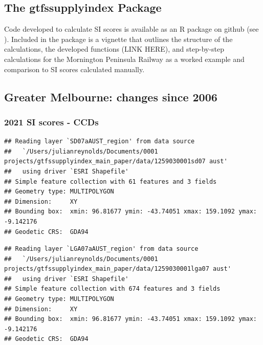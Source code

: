 \documentclass[preprint, 3p,
authoryear]{elsarticle} %
\begin{document}
\subsection{The gtfssupplyindex
Package}\label{the-gtfssupplyindex-package}

Code developed to calculate SI scores is available as an R package on
github (see \citet{gtfssupplyindex_github}). Included in the package is
a vignette that outlines the structure of the calculations, the
developed functions (LINK HERE), and step-by-step calculations for the
Mornington Peninsula Railway as a worked example and comparison to SI
scores calculated manually.

\subsection{Greater Melbourne: changes since
2006}\label{greater-melbourne-changes-since-2006}

\subsubsection{2021 SI scores - CCDs}\label{si-scores---ccds}

\begin{verbatim}
## Reading layer `SD07aAUST_region' from data source 
##   `/Users/julianreynolds/Documents/0001 projects/gtfssupplyindex_main_paper/data/1259030001sd07 aust' 
##   using driver `ESRI Shapefile'
## Simple feature collection with 61 features and 3 fields
## Geometry type: MULTIPOLYGON
## Dimension:     XY
## Bounding box:  xmin: 96.81677 ymin: -43.74051 xmax: 159.1092 ymax: -9.142176
## Geodetic CRS:  GDA94
\end{verbatim}

\begin{verbatim}
## Reading layer `LGA07aAUST_region' from data source 
##   `/Users/julianreynolds/Documents/0001 projects/gtfssupplyindex_main_paper/data/1259030001lga07 aust' 
##   using driver `ESRI Shapefile'
## Simple feature collection with 674 features and 3 fields
## Geometry type: MULTIPOLYGON
## Dimension:     XY
## Bounding box:  xmin: 96.81677 ymin: -43.74051 xmax: 159.1092 ymax: -9.142176
## Geodetic CRS:  GDA94
\end{verbatim}
\end{document}
